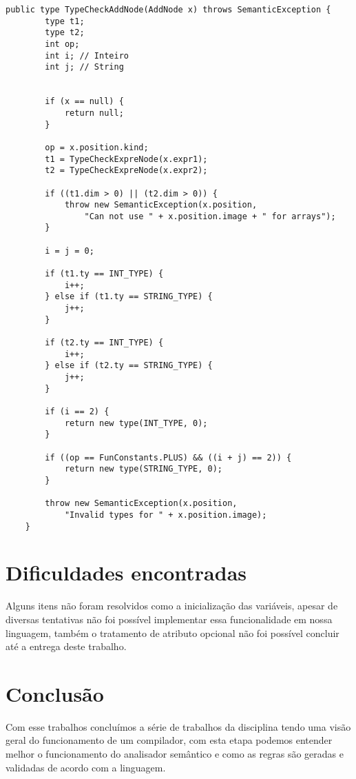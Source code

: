 \documentclass[
	article,			%
	11pt,				%
	oneside,			%
	a4paper,			%
	portuguese,			%
	brazil,				%
	sumario=tradicional
	]{abntex2}
\begin{document}
\begin{lstlisting}
public type TypeCheckAddNode(AddNode x) throws SemanticException {
        type t1;
        type t2;
        int op;
        int i; // Inteiro
        int j; // String


        if (x == null) {
            return null;
        }

        op = x.position.kind;
        t1 = TypeCheckExpreNode(x.expr1);
        t2 = TypeCheckExpreNode(x.expr2);

        if ((t1.dim > 0) || (t2.dim > 0)) {
            throw new SemanticException(x.position,
                "Can not use " + x.position.image + " for arrays");
        }

        i = j = 0;

        if (t1.ty == INT_TYPE) {
            i++;
        } else if (t1.ty == STRING_TYPE) {
            j++;
        }

        if (t2.ty == INT_TYPE) {
            i++;
        } else if (t2.ty == STRING_TYPE) {
            j++;
        }

        if (i == 2) {
            return new type(INT_TYPE, 0);
        }

        if ((op == FunConstants.PLUS) && ((i + j) == 2)) {
            return new type(STRING_TYPE, 0);
        }

        throw new SemanticException(x.position,
            "Invalid types for " + x.position.image);
    }
\end{lstlisting}

\section{Dificuldades encontradas}

Alguns itens não foram resolvidos como a inicialização das variáveis, apesar de diversas tentativas não foi possível implementar essa funcionalidade em nossa linguagem, também o tratamento de atributo opcional não foi possível concluir até a entrega deste trabalho.

\newpage
\section{Conclusão}

Com esse trabalhos concluímos a série de trabalhos da disciplina tendo uma visão geral do funcionamento de um compilador, com esta etapa podemos entender melhor o funcionamento do analisador semântico e como as regras são geradas e validadas de acordo com a linguagem.

\end{document}
